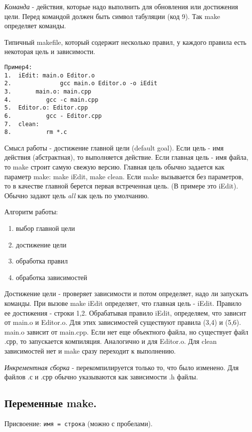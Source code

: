 \emph{Команда} - действия, которые надо выполнить для обновления или достижения цели. Перед командой должен быть символ табуляции (код 9). Так make определяет команды.

Типичный makefile, который содержит несколько правил, у каждого правила есть некоторая цель и зависимости.
\begin{verbatim}
Пример4: 
1. 	iEdit: main.o Editor.o
2.              gcc main.o Editor.o -o iEdit
3.       main.o: main.cpp
4. 	        gcc -c main.cpp
5.	Editor.o: Editor.cpp
6.	        gcc - Editor.cpp
7.	clean:
8.	        rm *.c
\end{verbatim}

Смысл работы - достижение главной цели (default goal). Если  цель - имя действия (абстрактная), то выполняется действие. Если главная цель - имя файла, то make строит самую свежую версию. Главная цель обычно задается как параметр make: make iEdit, make clean. Если make вызывается без параметров, то в качестве главной берется первая встреченная цель. (В примере  это iEdit). Обычно задают цель \emph{all} как цель по умолчанию.

Алгоритм работы:
\begin{enumerate}
	\item выбор главной цели
	\item достижение цели
	\item обработка правил
	\item обработка зависимостей
\end{enumerate}

Достижение цели - проверяет зависимости и потом определяет, надо ли запускать команды.
При вызове make iEdit определяет, что главная цель - iEdit. Правило ее достижения - строки 1,2. Обрабатывая правило iEdit, определяем, что зависит от main.o и Editor.o. Для этих зависимостей существуют правила (3,4) и (5,6). main.o зависит от main.cpp. Если нет еще объектного файла, но существует файл .срр, то запускается компиляция. Аналогично и для Editor.o. Для clean зависимостей нет и make сразу переходит к выполнению.

\emph{Инкрементная сборка} - перекомпилируется только то, что было изменено. Для файлов .с и .срр обычно указываются как зависимости .h файлы.

\subsection{Переменные make.}

Присвоение: \verb+имя = строка+ (можно с пробелами). 

